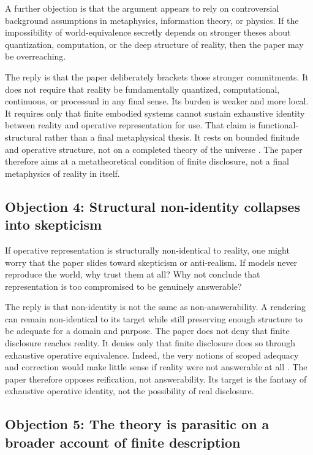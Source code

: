\documentclass[11pt]{article}
\begin{document}
A further objection is that the argument appears to rely on controversial background assumptions in metaphysics, information theory, or physics. If the impossibility of world-equivalence secretly depends on stronger theses about quantization, computation, or the deep structure of reality, then the paper may be overreaching.

The reply is that the paper deliberately brackets those stronger commitments. It does not require that reality be fundamentally quantized, computational, continuous, or processual in any final sense. Its burden is weaker and more local. It requires only that finite embodied systems cannot sustain exhaustive identity between reality and operative representation for use. That claim is functional-structural rather than a final metaphysical thesis. It rests on bounded finitude and operative structure, not on a completed theory of the universe \cite{Wheeler2024BoundedRationalitySEP,Simon1982ModelsBoundedRationality,ConantAshby1970GoodRegulator}. The paper therefore aims at a metatheoretical condition of finite disclosure, not a final metaphysics of reality in itself.

\subsection{Objection 4: Structural non-identity collapses into skepticism}

If operative representation is structurally non-identical to reality, one might worry that the paper slides toward skepticism or anti-realism. If models never reproduce the world, why trust them at all? Why not conclude that representation is too compromised to be genuinely answerable?

The reply is that non-identity is not the same as non-answerability. A rendering can remain non-identical to its target while still preserving enough structure to be adequate for a domain and purpose. The paper does not deny that finite disclosure reaches reality. It denies only that finite disclosure does so through exhaustive operative equivalence. Indeed, the very notions of scoped adequacy and correction would make little sense if reality were not answerable at all \cite{Chakravartty2011ScientificRealismSEP,FriggNguyen2021ScientificRepresentationSEP}. The paper therefore opposes reification, not answerability. Its target is the fantasy of exhaustive operative identity, not the possibility of real disclosure.

\subsection{Objection 5: The theory is parasitic on a broader account of finite description}
\end{document}
